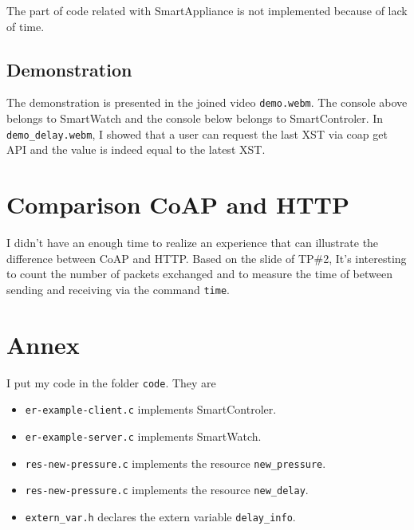 \documentclass[a4paper]{article}
\begin{document}
The part of code related with SmartAppliance is not implemented because of lack
of time.

\subsection{Demonstration}
The demonstration is presented in the joined video \texttt{demo.webm}.  The
console above belongs to SmartWatch and the console below belongs to
SmartControler. In \texttt{demo\_delay.webm}, I showed that a user can request
the last XST via coap get API and the value is indeed equal to the latest XST.



\section{Comparison CoAP and HTTP}

I didn't have an enough time to realize an experience that can illustrate the
difference between CoAP and HTTP. Based on the slide of TP\#2, It's interesting
to count the number of packets exchanged and to measure the time of between
sending and receiving via the command \texttt{time}.

\section*{Annex}
I put my code in the folder \texttt{code}. They are
\begin{itemize}
    \item \texttt{er-example-client.c} implements SmartControler.
    \item \texttt{er-example-server.c} implements SmartWatch.
    \item \texttt{res-new-pressure.c} implements the resource
        \texttt{new\_pressure}.
    \item \texttt{res-new-pressure.c} implements the resource
        \texttt{new\_delay}.
    \item \texttt{extern\_var.h} declares the extern variable
        \texttt{delay\_info}.
\end{itemize}

    
\end{document}
